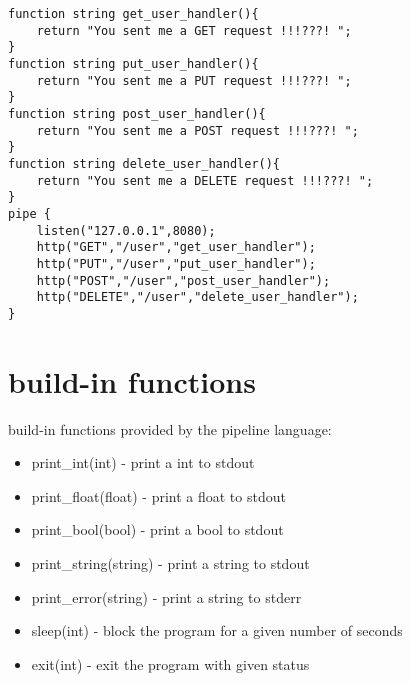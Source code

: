 \documentclass[./Report_main.tex]{subfiles}
\begin{document}
\begin{lstlisting}
function string get_user_handler(){
    return "You sent me a GET request !!!???! ";
}
function string put_user_handler(){
    return "You sent me a PUT request !!!???! ";
}
function string post_user_handler(){
    return "You sent me a POST request !!!???! ";
}
function string delete_user_handler(){
    return "You sent me a DELETE request !!!???! ";
}
pipe {
    listen("127.0.0.1",8080);
    http("GET","/user","get_user_handler");
    http("PUT","/user","put_user_handler");
    http("POST","/user","post_user_handler");
    http("DELETE","/user","delete_user_handler");
}

\end{lstlisting}
    


\section{build-in functions}
build-in functions provided by the pipeline language:\\
\begin{itemize}
    \item print\_int(int) - print a int to stdout
    \item print\_float(float) - print a float to stdout
    \item print\_bool(bool) - print a bool to stdout
    \item print\_string(string) - print a string to stdout
    \item print\_error(string) - print a string to stderr
    \item sleep(int) - block the program for a given number of seconds
    \item exit(int) - exit the program with given status
\end{itemize}
\end{document}
